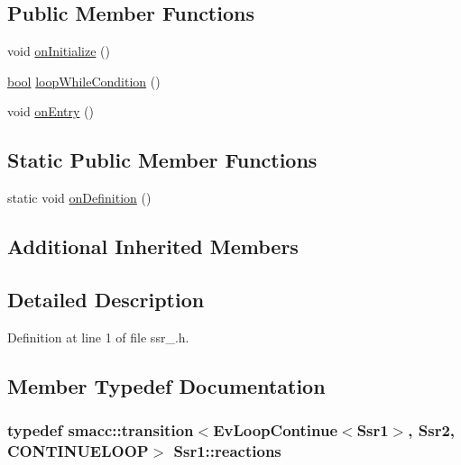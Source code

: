 \subsection*{Public Member Functions}
\begin{DoxyCompactItemize}
\item 
void \hyperlink{structSsr1_a59439edce482be88854d1efb41f9e676}{on\+Initialize} ()
\item 
\hyperlink{classbool}{bool} \hyperlink{structSsr1_af522c34c975a4d564c63e98383eb3292}{loop\+While\+Condition} ()
\item 
void \hyperlink{structSsr1_a115e61af7af5332f6e38350adea3cf39}{on\+Entry} ()
\end{DoxyCompactItemize}
\subsection*{Static Public Member Functions}
\begin{DoxyCompactItemize}
\item 
static void \hyperlink{structSsr1_a13808ade81c6393613fd27db45c00c94}{on\+Definition} ()
\end{DoxyCompactItemize}
\subsection*{Additional Inherited Members}


\subsection{Detailed Description}


Definition at line 1 of file ssr\+\_.\+h.



\subsection{Member Typedef Documentation}
\subsubsection[{\texorpdfstring{reactions}{reactions}}]{\setlength{\rightskip}{0pt plus 5cm}typedef {\bf smacc\+::transition}$<$Ev\+Loop\+Continue$<${\bf Ssr1}$>$, {\bf Ssr2}, C\+O\+N\+T\+I\+N\+U\+E\+L\+O\+OP$>$ {\bf Ssr1\+::reactions}}\hypertarget{structSsr1_a111c7f967fc4bfa3c4bc59453707ecf0}{}\label{structSsr1_a111c7f967fc4bfa3c4bc59453707ecf0}


